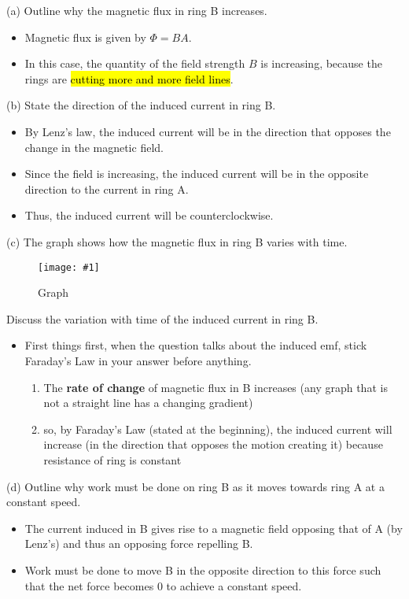 \documentclass[a4paper,12pt]{article}
\newcommand{\img}[4]{\begin{center}
  \begin{figure}[H]
    \centering
    \texttt{[image: \#1]}
    \caption{#3}
    \label{fig:#4}
  \end{figure}
\end{center}}
\begin{document}
(a) Outline why the magnetic flux in ring B increases.
\begin{itemize}
  \item Magnetic flux is given by $\Phi = BA$.
  \item In this case, the quantity of the field strength $B$ is increasing, because the rings are \hl{cutting more and more field lines}.
\end{itemize}
(b) State the direction of the induced current in ring B.
\begin{itemize}
  \item By Lenz's law, the induced current will be in the direction that opposes the change in the magnetic field.
  \item Since the field is increasing, the induced current will be in the opposite direction to the current in ring A.
  \item Thus, the induced current will be counterclockwise.
\end{itemize}
\pagebreak
(c) The graph shows how the magnetic flux in ring B varies with time.
\img{ex/mutual1.png}{0.45}{Graph}{mutual1}
Discuss the variation with time of the induced current in ring B.
\begin{itemize}
  \item First things first, when the question talks about the induced emf, stick Faraday's Law in your answer before anything.
        \begin{enumerate}
          \item The \textbf{rate of change} of magnetic flux in B increases (any graph that is not a straight line has a changing gradient)
          \item so, by Faraday's Law (stated at the beginning), the induced current will increase (in the direction that opposes the motion creating it) because resistance of ring is constant
        \end{enumerate}
\end{itemize}
(d) Outline why work must be done on ring B as it moves towards ring A at a constant speed.
\begin{itemize}
  \item The current induced in B gives rise to a magnetic field opposing that of A (by Lenz's) and thus an opposing force repelling B.
  \item Work must be done to move B in the opposite direction to this force such that the net force becomes 0 to achieve a constant speed.
\end{itemize}
\end{document}
